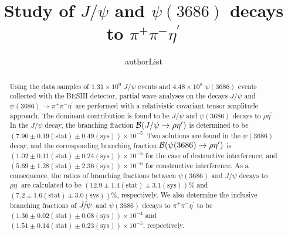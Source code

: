 \documentclass[twocolumn,showpacs,aps,prd]{revtex4-1}
\newcommand{\psip}{\psi(3686)}
\begin{document}


\title{\boldmath Study of $J/\psi$ and $\psi(3686)$ decays to $\pi^+\pi^-\eta^\prime$}

\author{ {authorList}}

\begin{abstract}
Using the data samples of $1.31\times 10^9$ $J/\psi$ events and $4.48\times 10^8$ $\psip$ events collected with the BESIII
detector, partial wave analyses on the decays $J/\psi$ and $\psip \to \pi^+\pi^-\eta^\prime$ are performed with a relativistic
covariant tensor amplitude approach. The dominant contribution is found to be $J/\psi$ and $\psip$ decays to $\rho\eta^\prime$. In the $J/\psi$ decay, the branching fraction ${\cal B}(J/\psi\to \rho\eta^\prime)$ is determined to be $(7.90\pm0.19(\mathrm{stat})\pm0.49(\mathrm{sys}))\times 10^{-5}$.  Two solutions are found in the $\psip$ decay, and the corresponding branching fraction ${\cal B}(\psip\to \rho\eta^\prime)$ is $(1.02\pm0.11(\mathrm{stat})\pm0.24(\mathrm{sys}))\times 10^{-5}$ for the case of destructive interference, and $(5.69\pm1.28(\mathrm{stat})\pm2.36(\mathrm{sys}))\times 10^{-6}$ for constructive interference. As a consequence, the ratios of branching fractions between $\psip$ and $J/\psi$ decays to $\rho\eta^\prime$ are calculated to be
$(12.9\pm1.4(\mathrm{stat})\pm3.1(\mathrm{sys}))$\% and $(7.2\pm1.6(\mathrm{stat})\pm3.0(\mathrm{sys}))$\%, respectively.
We also determine the inclusive branching fractions of $\jpsi$ and $\psip$ decays to $\pi^+\pi^-\eta^\prime$ to be $(1.36\pm0.02(\mathrm{stat})\pm0.08(\mathrm{sys}))\times 10^{-4}$ and $(1.51\pm0.14(\mathrm{stat})\pm 0.23(\mathrm{sys}))\times 10^{-5}$,
respectively.





\end{abstract}




\maketitle

\end{document}
